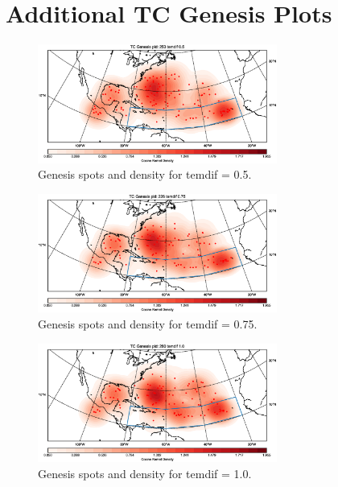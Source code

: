 



\chapter{Additional TC Genesis Plots}\label{sec:genesis-appendix}

\begin{figure}[ht]
	\centering
	\includegraphics[width=0.7\textwidth]{img/genesis_plot_temdif05.eps}
	\caption{Genesis spots and density for temdif = 0.5.}
\end{figure}
\begin{figure}[ht]
	\centering
	\includegraphics[width=0.7\textwidth]{img/genesis_plot_temdif075.eps}
	\caption{Genesis spots and density for temdif = 0.75.}
\end{figure}
\begin{figure}[ht]
	\centering
	\includegraphics[width=0.7\textwidth]{img/genesis_plot_temdif1.eps}
	\caption{Genesis spots and density for temdif = 1.0.}
\end{figure}
